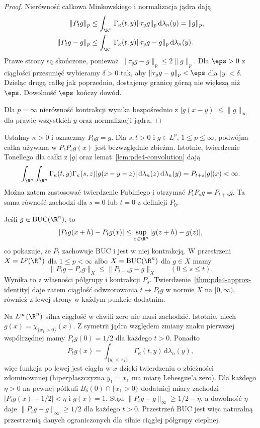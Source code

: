 \begin{proof}
Nierówność całkowa Minkowskiego i normalizacja
jądra dają
\[
 \begin{aligned}
 \|P_tg\|_p&\leq\int_{\R^n}\Gamma_\kappa(t,y)
                  \|\tau_yg\|_p\,\mathrm d\lambda_n(y)=\|g\|_p,\\
 \|P_tg-g\|_p&\leq\int_{\R^n}\Gamma_\kappa(t,y)
                  \|\tau_yg-g\|_p\,\mathrm d\lambda_n(y).
 \end{aligned}
\]
Prawe strony są skończone, ponieważ
$\|\tau_yg-g\|_p\leq2\|g\|_p$.
Dla $\eps>0$ z ciągłości przesunięć wybieramy
$\delta>0$ tak, aby $\|\tau_yg-g\|_p<\eps$
dla $|y|<\delta$. Dzieląc drugą całkę jak poprzednio,
dostajemy granicę górną nie większą niż $\eps$.
Dowolność $\eps$ kończy dowód.

Dla $p=\infty$ nierówność kontrakcji wynika
bezpośrednio z $|g(x-y)|\leq\|g\|_\infty$
dla prawie wszystkich $y$ oraz normalizacji jądra.
\end{proof}

Ustalmy $\kappa>0$ i oznaczmy $P_0g=g$.
Dla $s,t>0$ i $g\in L^p$, $1\leq p\leq\infty$,
podwójna całka używana w $P_tP_sg(x)$ jest
bezwzględnie zbieżna. Istotnie, twierdzenie Tonellego
dla całki z $|g|$ oraz lemat~\ref{lem:pde4-convolution}
dają
\[
 \int_{\R^n}\int_{\R^n}\Gamma_\kappa(t,y)
 \Gamma_\kappa(s,z)|g(x-y-z)|\,
 \mathrm d\lambda_n(z)\,\mathrm d\lambda_n(y)
 =P_{t+s}|g|(x)<\infty.
\]
Można zatem zastosować twierdzenie Fubiniego
i otrzymać $P_tP_sg=P_{t+s}g$. Ta sama równość
zachodzi dla $s=0$ lub $t=0$ z definicji $P_0$.

Jeśli $g\in\mathrm{BUC}(\R^n)$, to
\[
 |P_tg(x+h)-P_tg(x)|
 \leq\sup_{z\in\R^n}|g(z+h)-g(z)|,
\]
co pokazuje, że $P_t$ zachowuje $\mathrm{BUC}$
i jest w niej kontrakcją.
W przestrzeni $X=L^p(\R^n)$ dla $1\leq p<\infty$
albo $X=\mathrm{BUC}(\R^n)$ dla $g\in X$ mamy
\[
 \|P_tg-P_sg\|_X\leq\|P_{t-s}g-g\|_X
 \qquad(0\leq s\leq t).
\]
Wynika to z własności półgrupy i kontrakcji
$P_s$. Twierdzenie~\ref{thm:pde4-approx-identity}
daje zatem ciągłość odwzorowania $t\mapsto P_tg$
w normie $X$ na $[0,\infty)$, również z lewej
strony w każdym punkcie dodatnim.

Na $L^\infty(\R^n)$ silna ciągłość w chwili zero
nie musi zachodzić. Istotnie, niech
$g(x)=\chi_{\{x_1>0\}}(x)$.
Z symetrii jądra względem zmiany znaku pierwszej
współrzędnej mamy $P_tg(0)=1/2$ dla każdego $t>0$.
Ponadto
\[
 P_tg(x)=\int_{\{y_1<x_1\}}\Gamma_\kappa(t,y)\,
 \mathrm d\lambda_n(y),
\]
więc funkcja po lewej jest ciągła w $x$ dzięki
twierdzeniu o zbieżności zdominowanej (hiperpłaszczyzna
$y_1=x_1$ ma miarę Lebesgue'a zero).
Dla każdego $\eta>0$ na pewnej półkuli
$B_\delta(0)\cap\{x_1>0\}$ dodatniej miary
zachodzi $|P_tg(x)-1/2|<\eta$ i $g(x)=1$.
Stąd $\|P_tg-g\|_\infty\geq1/2-\eta$,
a dowolność $\eta$ daje
$\|P_tg-g\|_\infty\geq1/2$ dla każdego $t>0$.
Przestrzeń $\mathrm{BUC}$ jest więc naturalną
przestrzenią danych ograniczonych dla silnie
ciągłej półgrupy cieplnej.

